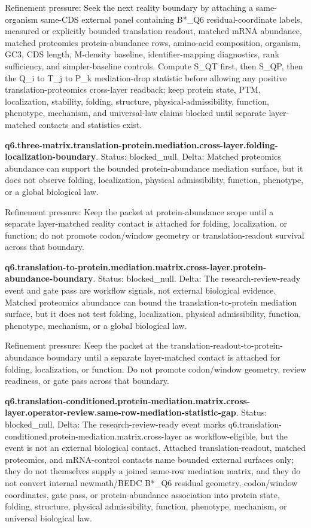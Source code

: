 Refinement pressure: Seek the next reality boundary by attaching a same-organism same-CDS external panel containing B*\_Q6 residual-coordinate labels, measured or explicitly bounded translation readout, matched mRNA abundance, matched proteomics protein-abundance rows, amino-acid composition, organism, GC3, CDS length, M-density baseline, identifier-mapping diagnostics, rank sufficiency, and simpler-baseline controls. Compute S\_QT first, then S\_QP, then the Q\_i to T\_j to P\_k mediation-drop statistic before allowing any positive translation-proteomics cross-layer readback; keep protein state, PTM, localization, stability, folding, structure, physical-admissibility, function, phenotype, mechanism, and universal-law claims blocked until separate layer-matched contacts and statistics exist.

\textbf{q6.three-matrix.translation-protein.mediation.cross-layer.folding-localization-boundary}. Status: blocked\_null. Delta: Matched proteomics abundance can support the bounded protein-abundance mediation surface, but it does not observe folding, localization, physical admissibility, function, phenotype, or a global biological law.

Refinement pressure: Keep the packet at protein-abundance scope until a separate layer-matched reality contact is attached for folding, localization, or function; do not promote codon/window geometry or translation-readout survival across that boundary.

\textbf{q6.translation-to-protein.mediation.matrix.cross-layer.protein-abundance-boundary}. Status: blocked\_null. Delta: The research-review-ready event and gate pass are workflow signals, not external biological evidence. Matched proteomics abundance can bound the translation-to-protein mediation surface, but it does not test folding, localization, physical admissibility, function, phenotype, mechanism, or a global biological law.

Refinement pressure: Keep the packet at the translation-readout-to-protein-abundance boundary until a separate layer-matched contact is attached for folding, localization, or function. Do not promote codon/window geometry, review readiness, or gate pass across that boundary.

\textbf{q6.translation-conditioned.protein-mediation.matrix.cross-layer.operator-review.same-row-mediation-statistic-gap}. Status: blocked\_null. Delta: The research-review-ready event marks q6.translation-conditioned.protein-mediation.matrix.cross-layer as workflow-eligible, but the event is not an external biological contact. Attached translation-readout, matched proteomics, and mRNA-control contacts name bounded external surfaces only; they do not themselves supply a joined same-row mediation matrix, and they do not convert internal newmath/BEDC B*\_Q6 residual geometry, codon/window coordinates, gate pass, or protein-abundance association into protein state, folding, structure, physical admissibility, function, phenotype, mechanism, or universal biological law.


